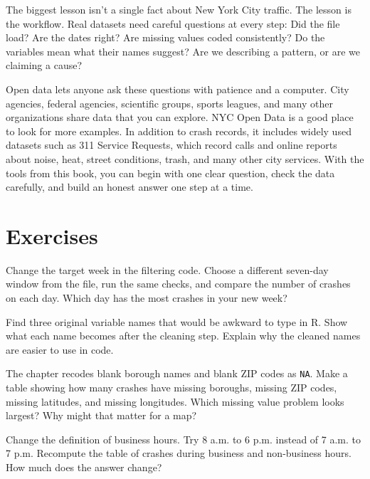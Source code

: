 The biggest lesson isn't a single fact about New York City traffic. The
lesson is the workflow. Real datasets need careful questions at every
step: Did the file load? Are the dates right? Are missing values coded
consistently? Do the variables mean what their names suggest? Are we
describing a pattern, or are we claiming a cause?

Open data lets anyone ask these questions with patience and a
computer. City agencies, federal agencies, scientific groups, sports
leagues, and many other organizations share data that you can
explore. NYC Open Data is a good place to look for more examples. In
addition to crash records, it includes widely used datasets such as 311
Service Requests, which record calls and online reports about noise,
heat, street conditions, trash, and many other city services. With the
tools from this book, you can begin with one clear question, check the
data carefully, and build an honest answer one step at a time.

\section{Exercises}

\begin{exercise}
Change the target week in the filtering code. Choose a different
seven-day window from the file, run the same checks, and compare the
number of crashes on each day. Which day has the most crashes in your
new week?
\end{exercise}

\begin{exercise}
Find three original variable names that would be awkward to type in R.
Show what each name becomes after the cleaning step. Explain why the
cleaned names are easier to use in code.
\end{exercise}

\begin{exercise}
The chapter recodes blank borough names and blank ZIP codes as
\lstinline{NA}. Make a table showing how many crashes have missing
boroughs, missing ZIP codes, missing latitudes, and missing longitudes.
Which missing value problem looks largest? Why might that matter for a
map?
\end{exercise}

\begin{exercise}
Change the definition of business hours. Try 8 a.m. to 6 p.m. instead
of 7 a.m. to 7 p.m. Recompute the table of crashes during business and
non-business hours. How much does the answer change?
\end{exercise}

